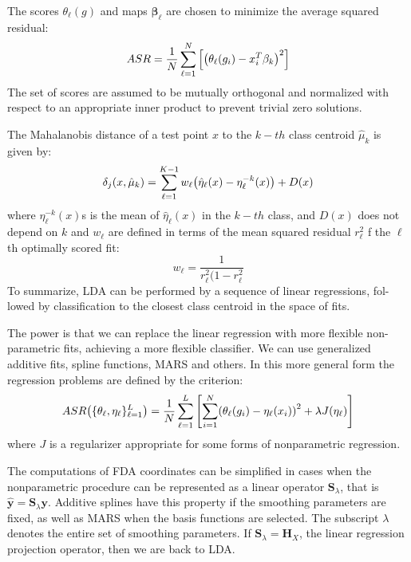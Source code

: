 \documentclass[12pt, letterpaper]{article}
\theoremstyle{definition}
\newcommand{\y}{\mathbf{y}}
\newcommand{\be}{\mathbf{\beta}}
\DeclarePairedDelimiter\autobracket{(}{)}
\newcommand{\br}[1]{\autobracket*{#1}}
\begin{document}
The scores $\theta_\ell(g)$ and maps $\be_\ell$ are chosen to minimize the average squared residual:
\begin{equation}
ASR = \frac{1}{N}\sum_{\ell=1}^N\left[ \br{\theta_\ell(g_i) - x_i^T\be_k}^2\right]
\end{equation}
The set of scores are assumed to be mutually orthogonal and normalized with respect to an appropriate inner product to prevent trivial zero solutions.

The Mahalanobis distance of a test point $x$ to the $k-th$ class centroid $\hat{\mu}_k$ is given by:
\begin{equation}
\delta_j (x, \hat{\mu}_k) = \sum_{\ell=1}^{K-1} w_\ell \br{\hat{\eta}_\ell(x) - \eta_\ell^{-k}(x) }+D(x)
\end{equation}
where $\eta_\ell^{-k}(x) $s is the mean of $\hat{\eta}_\ell(x)$ in the $k-th$ class, and $D(x)$ does not depend on $k$ and $w_\ell$ are defined in terms of the mean squared residual $r_\ell^2$ f the $\ell$th optimally scored fit:
\begin{equation}
w_\ell = \frac{1}{r_\ell^2(1-r_\ell^2}
\end{equation}
To summarize, LDA can be performed by a sequence of linear regressions, fol- lowed by classification to the closest class centroid in the space of fits.

The power is that we can replace the linear regression with more flexible non-parametric fits, achieving a more flexible classifier. We can use generalized additive fits, spline functions, MARS and others. In this more general form the regression problems are defined by the criterion:
\begin{equation}
ASR \br{\{\theta_\ell, \eta_\ell \}_{\ell=1}^L} = \frac{1}{N}\sum_{\ell=1}^L\left[\sum_{i=1}^N \br{\theta_\ell(g_i) - \eta_\ell(x_i)}^2 + \lambda J(\eta_\ell)\right]
\end{equation}
where $J$ is a regularizer appropriate for some forms of nonparametric regression.

The computations of FDA coordinates can be simplified in cases when the nonparametric procedure can be represented as a linear operator $\mathbf{S}_\lambda$, that is $\hat{\y} =\mathbf{S}_\lambda \y$. Additive splines have this property if the smoothing parameters are fixed, as well as MARS when the basis functions are selected. The subscript $\lambda$ denotes the entire set of smoothing parameters. If $\mathbf{S}_\lambda = \mathbf{H}_X$, the linear regression projection operator, then we are back to LDA.
\end{document}
